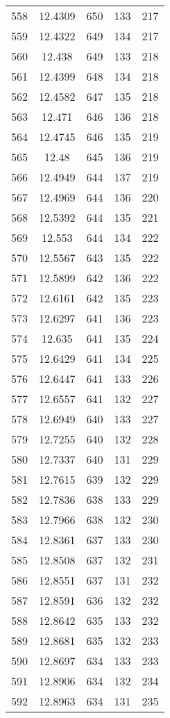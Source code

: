 \documentclass[12pt,a4paper]{article}
\begin{document}
\begin{tabular}{r|cccc}
	558 & 12.4309 & 650 & 133 & 217 \\
	559 & 12.4322 & 649 & 134 & 217 \\
	560 & 12.438 & 649 & 133 & 218 \\
	561 & 12.4399 & 648 & 134 & 218 \\
	562 & 12.4582 & 647 & 135 & 218 \\
	563 & 12.471 & 646 & 136 & 218 \\
	564 & 12.4745 & 646 & 135 & 219 \\
	565 & 12.48 & 645 & 136 & 219 \\
	566 & 12.4949 & 644 & 137 & 219 \\
	567 & 12.4969 & 644 & 136 & 220 \\
	568 & 12.5392 & 644 & 135 & 221 \\
	569 & 12.553 & 644 & 134 & 222 \\
	570 & 12.5567 & 643 & 135 & 222 \\
	571 & 12.5899 & 642 & 136 & 222 \\
	572 & 12.6161 & 642 & 135 & 223 \\
	573 & 12.6297 & 641 & 136 & 223 \\
	574 & 12.635 & 641 & 135 & 224 \\
	575 & 12.6429 & 641 & 134 & 225 \\
	576 & 12.6447 & 641 & 133 & 226 \\
	577 & 12.6557 & 641 & 132 & 227 \\
	578 & 12.6949 & 640 & 133 & 227 \\
	579 & 12.7255 & 640 & 132 & 228 \\
	580 & 12.7337 & 640 & 131 & 229 \\
	581 & 12.7615 & 639 & 132 & 229 \\
	582 & 12.7836 & 638 & 133 & 229 \\
	583 & 12.7966 & 638 & 132 & 230 \\
	584 & 12.8361 & 637 & 133 & 230 \\
	585 & 12.8508 & 637 & 132 & 231 \\
	586 & 12.8551 & 637 & 131 & 232 \\
	587 & 12.8591 & 636 & 132 & 232 \\
	588 & 12.8642 & 635 & 133 & 232 \\
	589 & 12.8681 & 635 & 132 & 233 \\
	590 & 12.8697 & 634 & 133 & 233 \\
	591 & 12.8906 & 634 & 132 & 234 \\
	592 & 12.8963 & 634 & 131 & 235 \\

\end{tabular}
\end{document}
